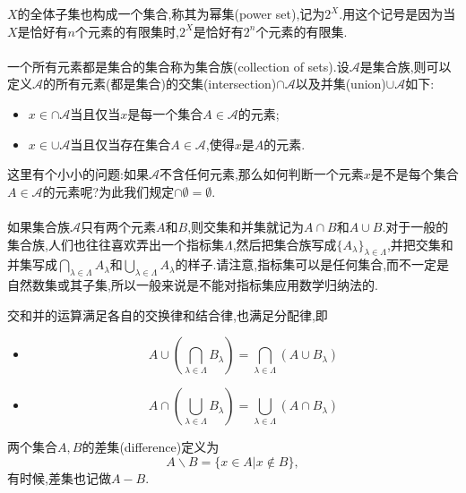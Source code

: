 \begin{frame}
	$X$的全体子集也构成一个集合,称其为\alert{幂集}(power set),记为$2^X$.用这个记号是因为当$X$是恰好有$n$个元素的有限集时,$2^X$是恰好有$2^n$个元素的有限集.
	\\ \hspace*{\fill} \\%
	一个所有元素都是集合的集合称为\alert{集合族}(collection of sets).设$\mathcal{A}$是集合族,则可以定义$\mathcal{A}$的所有元素(都是集合)的\alert{交集}(intersection)$\cap\mathcal{A}$以及\alert{并集}(union)$\cup\mathcal{A}$如下:
	\begin{itemize}
		\item $x\in\cap\mathcal{A}$当且仅当$x$是每一个集合$A\in\mathcal{A}$的元素;
		\item $x\in\cup\mathcal{A}$当且仅当存在集合$A\in\mathcal{A}$,使得$x$是$A$的元素.
	\end{itemize}
	
\end{frame}

\begin{frame}
	这里有个小小的问题:如果$\mathcal{A}$不含任何元素,那么如何判断一个元素$x$是不是每个集合$A\in\mathcal{A}$的元素呢?为此我们规定$\cap\emptyset = \emptyset$.
	\\ \hspace*{\fill} \\%
	如果集合族$\mathcal{A}$只有两个元素$A$和$B$,则交集和并集就记为$A\cap B$和$A\cup B$.对于一般的集合族,人们也往往喜欢弄出一个指标集$\Lambda$,然后把集合族写成$\{A_{\lambda}\}_{\lambda\in\Lambda}$,并把交集和并集写成$\bigcap_{\lambda\in\Lambda}A_{\lambda}$和$\bigcup_{\lambda\in\Lambda}A_{\lambda}$的样子.请注意,指标集可以是任何集合,而不一定是自然数集或其子集,所以一般来说是不能对指标集应用数学归纳法的.
\end{frame}

\begin{frame}
	交和并的运算满足各自的交换律和结合律,也满足分配律,即
	\begin{itemize}
		\item \begin{equation}
		A\cup\left(\bigcap_{\lambda\in\Lambda}B_{\lambda} \right) = \bigcap_{\lambda\in\Lambda} \left(A\cup B_{\lambda} \right)
		\end{equation}
		\item \begin{equation}
		A\cap\left(\bigcup_{\lambda\in\Lambda}B_{\lambda} \right) = \bigcup_{\lambda\in\Lambda} \left(A\cap B_{\lambda} \right)
		\end{equation}
	\end{itemize}
	两个集合$A,B$的\alert{差集}(difference)定义为\begin{equation}
		A\backslash B = \{x\in A|x\notin B \},
	\end{equation}
	有时候,差集也记做$A-B$.
\end{frame}

